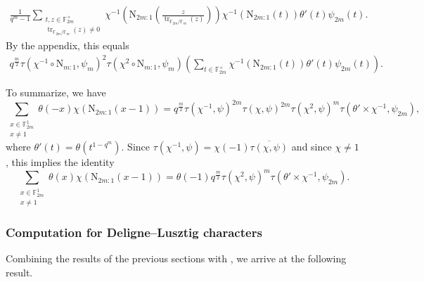 \documentclass[12pt, reqno]{amsart}
\theoremstyle{definition}
\theoremstyle{definition}
\theoremstyle{definition}
\newcommand{\multiplicativegroup}[1]{#1^{\times}}
\newcommand{\conjugate}[1]{\overline{#1}}
\newcommand{\fieldCharacter}{\psi}
\newcommand{\trace}{\operatorname{tr}}
\newcommand{\FieldNorm}[2]{\mathrm{N}_{#1:#2}}
\newcommand{\finiteField}{\mathbb{F}}
\newcommand{\finiteFieldExtension}[1]{\finiteField_{#1}}
\begin{document}
\begin{align*}
	\frac{1}{q^m-1}\sum_{\substack{t,z \in \multiplicativegroup{\finiteFieldExtension{2m}}\\
	\trace_{\finiteFieldExtension{2m} \slash \finiteFieldExtension{m}}\left(z\right) \ne 0}} \chi^{-1}\left(\FieldNorm{2m}{1}\left(\frac{z}{\trace_{\finiteFieldExtension{2m} \slash \finiteFieldExtension{m}}\left(z\right) }\right)\right) \chi^{-1}\left(\FieldNorm{2m}{1}\left(t\right)\right) \theta' \left(t\right) \fieldCharacter_{2m}\left(t\right).
\end{align*}
By the appendix, this equals
\begin{align*}
	q^{\frac{m}{2}} \tau\left(\chi^{-1} \circ \FieldNorm{m}{1}, \fieldCharacter_m\right)^2 \tau\left(\chi^{2} \circ \FieldNorm{m}{1}, \fieldCharacter_m\right) \left(\sum_{t \in \multiplicativegroup{\finiteFieldExtension{2m}}} \chi^{-1}\left(\FieldNorm{2m}{1}\left(t\right)\right) \theta' \left(t\right) \fieldCharacter_{2m}\left(t\right)\right).
\end{align*}

To summarize, we have
$$\sum_{\substack{x \in \finiteFieldExtension{2m}^1\\
		x \ne 1}} \theta \left(-x\right) \chi\left(\FieldNorm{2m}{1}\left(x - 1\right)\right) = q^{\frac{m}{2}} \tau\left(\chi^{-1}, \fieldCharacter\right)^{2m} \tau\left(\chi, \fieldCharacter\right)^{2m} \tau\left(\chi^{2}, \fieldCharacter\right)^m \tau\left(\theta' \times \chi^{-1}, \fieldCharacter_{2m}\right),$$
	where $\theta'\left(t\right) = \theta\left(t^{1-q^m}\right)$.
Since $\tau\left(\chi^{-1}, \fieldCharacter\right) = \chi\left(-1\right) \conjugate{\tau\left(\chi, \fieldCharacter\right)}$ and since $\chi \ne 1$, this implies the identity
$$\sum_{\substack{x \in \finiteFieldExtension{2m}^1\\
		x \ne 1}} \theta \left(x\right) \chi\left(\FieldNorm{2m}{1}\left(x - 1\right)\right) = \theta\left(-1\right) q^{\frac{m}{2}} \tau\left(\chi^{2}, \fieldCharacter\right)^m \tau\left(\theta' \times \chi^{-1}, \fieldCharacter_{2m}\right).$$

\subsubsection{Computation for Deligne--Lusztig characters}
Combining the results of the previous sections with , we arrive at the following result.
\end{document}
